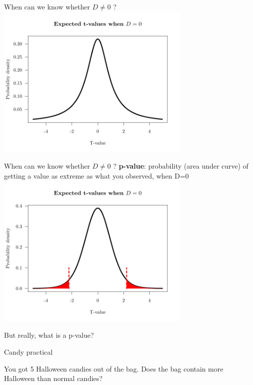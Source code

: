 \documentclass{beamer}
\begin{document}
\begin{frame}{When can we know whether $D \neq 0$ ?}
  \centering \includegraphics[width=0.7\textwidth]{Figures/figure/tvalue-1}
\end{frame}


\begin{frame}{When can we know whether $D \neq 0$ ?}
\textbf{p-value}: probability (area under curve) of getting a value as extreme as what you observed, when D=0
\centering  \includegraphics[width=0.7\textwidth]{Figures/figure/tvalueth-1}
\end{frame}


\begin{frame}{But really, what is a p-value?}
 \begin{block}{Candy practical}
 
 You got 5 Halloween candies out of the bag. Does the bag contain more Halloween than normal candies?
 
 \end{block}
 
\end{frame}
\end{document}
